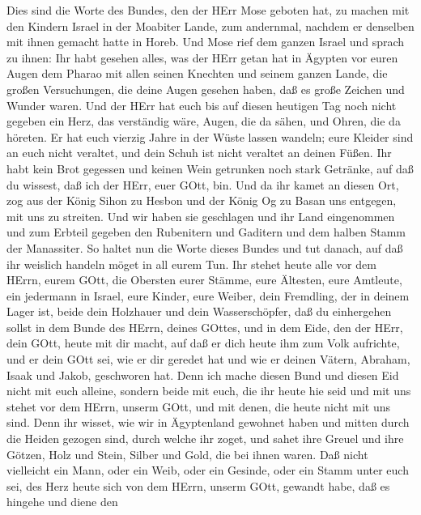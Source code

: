  Dies sind die Worte des Bundes, den der HErr Mose geboten
hat, zu machen mit den Kindern Israel in der Moabiter Lande, zum
andernmal, nachdem er denselben mit ihnen gemacht hatte in Horeb.
 Und Mose rief dem ganzen Israel und sprach zu ihnen: Ihr
habt gesehen alles, was der HErr getan hat in Ägypten vor euren Augen
dem Pharao mit allen seinen Knechten und seinem ganzen Lande,
 die großen Versuchungen, die deine Augen gesehen haben, daß
es große Zeichen und Wunder waren.  Und der HErr hat euch
bis auf diesen heutigen Tag noch nicht gegeben ein Herz, das verständig
wäre, Augen, die da sähen, und Ohren, die da höreten.  Er
hat euch vierzig Jahre in der Wüste lassen wandeln; eure Kleider sind an
euch nicht veraltet, und dein Schuh ist nicht veraltet an deinen Füßen.
 Ihr habt kein Brot gegessen und keinen Wein getrunken noch
stark Getränke, auf daß du wissest, daß ich der HErr, euer GOtt, bin.
 Und da ihr kamet an diesen Ort, zog aus der König Sihon zu
Hesbon und der König Og zu Basan uns entgegen, mit uns zu streiten. Und
wir haben sie geschlagen  und ihr Land eingenommen und zum
Erbteil gegeben den Rubenitern und Gaditern und dem halben Stamm der
Manassiter.  So haltet nun die Worte dieses Bundes und tut
danach, auf daß ihr weislich handeln möget in all eurem Tun.
 Ihr stehet heute alle vor dem HErrn, eurem GOtt, die
Obersten eurer Stämme, eure Ältesten, eure Amtleute, ein jedermann in
Israel,  eure Kinder, eure Weiber, dein Fremdling, der in
deinem Lager ist, beide dein Holzhauer und dein Wasserschöpfer,
 daß du einhergehen sollst in dem Bunde des HErrn, deines
GOttes, und in dem Eide, den der HErr, dein GOtt, heute mit dir macht,
 auf daß er dich heute ihm zum Volk aufrichte, und er dein
GOtt sei, wie er dir geredet hat und wie er deinen Vätern, Abraham,
Isaak und Jakob, geschworen hat.  Denn ich mache diesen
Bund und diesen Eid nicht mit euch alleine,  sondern beide
mit euch, die ihr heute hie seid und mit uns stehet vor dem HErrn,
unserm GOtt, und mit denen, die heute nicht mit uns sind. 
Denn ihr wisset, wie wir in Ägyptenland gewohnet haben und mitten durch
die Heiden gezogen sind, durch welche ihr zoget,  und sahet
ihre Greuel und ihre Götzen, Holz und Stein, Silber und Gold, die bei
ihnen waren.  Daß nicht vielleicht ein Mann, oder ein Weib,
oder ein Gesinde, oder ein Stamm unter euch sei, des Herz heute sich von
dem HErrn, unserm GOtt, gewandt habe, daß es hingehe und diene den
